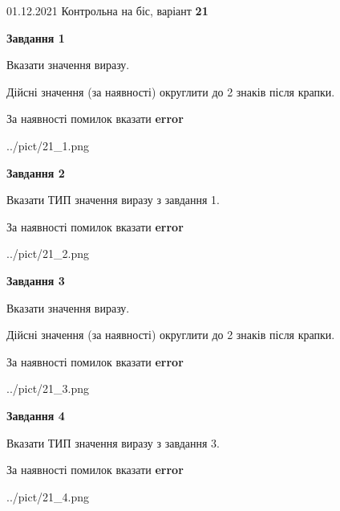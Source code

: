 \documentclass[11pt, ukrainian]{article}
\begin{document}
{01.12.2021 Контрольна на біс, варіант  \No \textbf { 21 }\par}
{
\begin {large}
{\begin {center}\textbf{Завдання 1}\end {center}}\par
Вказати значення виразу. \par
Дійсні значення (за наявності) округлити до 2 знаків після крапки. \par
За наявності помилок вказати \textbf{error}

\begin{center}
	{../pict/21_1.png}
\end{center}
\newpage

{\begin {center}\textbf{Завдання 2}\end {center}}\par
Вказати ТИП значення виразу з завдання 1. \par
За наявності помилок вказати \textbf{error}

\begin{center}
	{../pict/21_2.png}
\end{center}
\newpage

{\begin {center}\textbf{Завдання 3}\end {center}}\par
Вказати значення виразу. \par
Дійсні значення (за наявності) округлити до 2 знаків після крапки. \par
За наявності помилок вказати \textbf{error}

\begin{center}
	{../pict/21_3.png}
\end{center}
\newpage

{\begin {center}\textbf{Завдання 4}\end {center}}\par
Вказати ТИП значення виразу з завдання 3. \par
За наявності помилок вказати \textbf{error}

\begin{center}
	{../pict/21_4.png}
\end{center}
\newpage


\end{large}}
\end{document}
